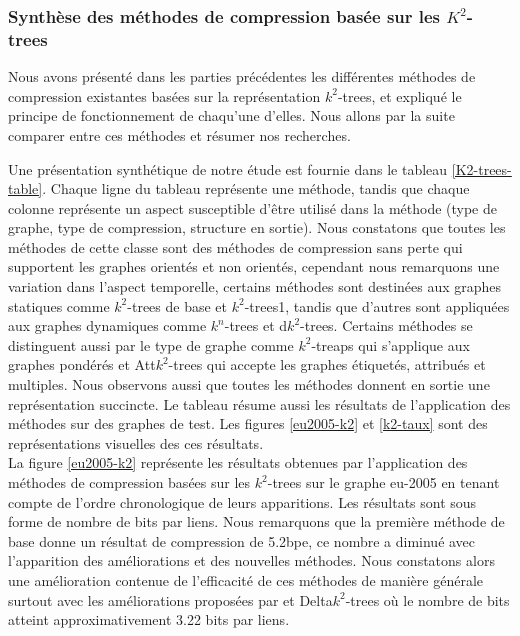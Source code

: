 
\subsubsection{Synthèse des méthodes de compression basée sur les $K^2$-trees }

Nous avons présenté dans les parties précédentes les différentes méthodes de compression existantes basées sur la représentation $k^2$-trees, et expliqué le principe de fonctionnement de chaqu'une d'elles. Nous allons par la suite comparer entre ces méthodes et résumer nos recherches.

Une présentation synthétique de notre étude est fournie dans le tableau \ref{K2-trees-table}. Chaque ligne du tableau représente une méthode, tandis que chaque colonne
représente un aspect susceptible d’être utilisé dans la méthode (type de graphe, type de compression, structure en sortie). Nous constatons que toutes les méthodes de cette classe sont des méthodes de compression sans perte qui supportent les graphes orientés et non orientés, cependant nous remarquons une variation dans l'aspect temporelle, certains méthodes sont destinées aux graphes statiques comme $k^2$-trees de base et $k^2$-trees1, tandis que d'autres sont appliquées aux graphes dynamiques comme $k^n$-trees et d$k^2$-trees. Certains méthodes se distinguent aussi par le type de graphe comme $k^2$-treaps qui s'applique aux graphes pondérés et Att$k^2$-trees qui accepte les graphes étiquetés, attribués et multiples. Nous observons aussi que toutes les méthodes donnent en sortie une représentation succincte. Le tableau résume aussi les résultats de l'application des méthodes sur des graphes de test. Les figures \ref{eu2005-k2} et \ref{k2-taux} sont des représentations visuelles des ces résultats.\\

La figure \ref{eu2005-k2} représente les résultats obtenues par l'application des méthodes de compression basées sur les $k^2$-trees sur le graphe eu-2005 en tenant compte de l’ordre chronologique de leurs apparitions. Les résultats sont sous forme de nombre de bits par liens. Nous remarquons que la première méthode de base donne un résultat de compression de 5.2bpe, ce nombre a diminué avec l'apparition des améliorations et des nouvelles méthodes. Nous constatons alors une amélioration contenue de l'efficacité de ces méthodes de manière générale surtout avec les améliorations proposées par \citep{brisaboa2014compact} et Delta$k^2$-trees où le nombre de bits atteint approximativement 3.22 bits par liens.

